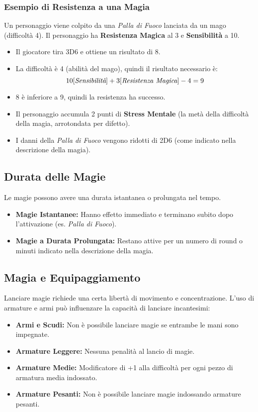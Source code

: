 \documentclass[../manuale_main.tex]{subfiles}
\begin{document}
\subsubsection{Esempio di Resistenza a una Magia}
Un personaggio viene colpito da una \textit{Palla di Fuoco} lanciata da un mago (difficoltà 4). Il personaggio ha \textbf{Resistenza Magica} al 3 e \textbf{Sensibilità} a 10.

\begin{itemize}
    \item Il giocatore tira 3D6 e ottiene un risultato di 8.
    \item La difficoltà è 4 (abilità del mago), quindi il risultato necessario è:
    \[
    10 [\emph{Sensibilità}] + 3 [\emph{Resistenza Magica}] - 4 = 9
    \]
    \item 8 è inferiore a 9, quindi la resistenza ha successo.
    \item Il personaggio accumula 2 punti di \textbf{Stress Mentale} (la metà della difficoltà della magia, arrotondata per difetto).
    \item I danni della \textit{Palla di Fuoco} vengono ridotti di 2D6 (come indicato nella descrizione della magia).
\end{itemize}

\subsection{Durata delle Magie}
Le magie possono avere una durata istantanea o prolungata nel tempo. 

\begin{itemize}
    \item \textbf{Magie Istantanee:} Hanno effetto immediato e terminano subito dopo l'attivazione (es. \textit{Palla di Fuoco}).
    \item \textbf{Magie a Durata Prolungata:} Restano attive per un numero di round o minuti indicato nella descrizione della magia. 
\end{itemize}

\subsection{Magia e Equipaggiamento}
Lanciare magie richiede una certa libertà di movimento e concentrazione. L'uso di armature e armi può influenzare la capacità di lanciare incantesimi:

\begin{itemize}
    \item \textbf{Armi e Scudi:} Non è possibile lanciare magie se entrambe le mani sono impegnate.
    \item \textbf{Armature Leggere:} Nessuna penalità al lancio di magie.
    \item \textbf{Armature Medie:} Modificatore di +1 alla difficoltà per ogni pezzo di armatura media indossato.
    \item \textbf{Armature Pesanti:} Non è possibile lanciare magie indossando armature pesanti.
\end{itemize}
\end{document}

